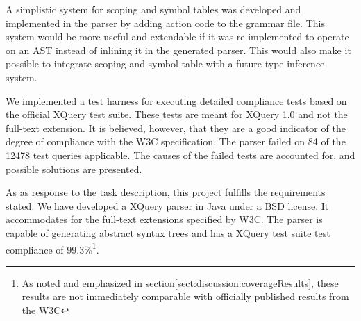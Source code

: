A simplistic system for scoping and symbol tables was developed and implemented
in the parser by adding action code to the grammar file. This system would be
more useful and extendable if it was re-implemented to operate on an AST
instead of inlining it in the generated parser. This would also make it
possible to integrate scoping and symbol table with a future type inference
system.     

We implemented a test harness for executing detailed compliance tests based on
the official XQuery test suite\cite{w3c05}. These tests are meant for XQuery
1.0 and not the full-text extension. It is believed, however, that they are a
good indicator of the degree of compliance with the W3C specification. The parser
failed on 84 of the 12478 test queries applicable. The causes of the failed
tests are accounted for, and possible solutions are presented. 

As as response to the task description, this project fulfills the requirements
stated. We have developed a XQuery parser in Java under a BSD license. It
accommodates for the full-text extensions specified by W3C. The parser is
capable of generating abstract syntax trees and has a XQuery test suite test
compliance of 99.3\%\footnote{As noted and emphasized in
section\ref{sect:discussion:coverageResults}, these results are not immediately
comparable with officially published results from the W3C}.

